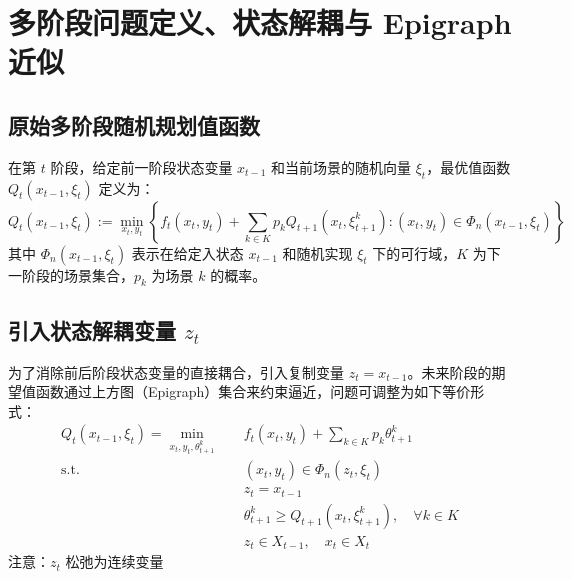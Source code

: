 \documentclass[11pt]{ctexart}
\begin{document}
\section{多阶段问题定义、状态解耦与 Epigraph 近似}

\subsection{原始多阶段随机规划值函数}
在第 $t$ 阶段，给定前一阶段状态变量 $x_{t-1}$ 和当前场景的随机向量 $\xi_t$，最优值函数 $Q_t(x_{t-1}, \xi_t)$ 定义为：
\begin{equation}
Q_{t}(x_{t-1}, \xi_{t}) := \min_{x_{t}, y_{t}} \left\{ f_{t}(x_{t}, y_{t}) + \sum_{k \in K} p_{k} Q_{t+1}(x_{t}, \xi_{t+1}^{k}) : (x_{t}, y_{t}) \in \Phi_{n}(x_{t-1}, \xi_{t}) \right\}
\end{equation}
其中 $\Phi_{n}(x_{t-1}, \xi_{t})$ 表示在给定入状态 $x_{t-1}$ 和随机实现 $\xi_t$ 下的可行域，$K$ 为下一阶段的场景集合，$p_k$ 为场景 $k$ 的概率。

\subsection{引入状态解耦变量 $z_t$}
为了消除前后阶段状态变量的直接耦合，引入复制变量 $z_{t} = x_{t-1}$。未来阶段的期望值函数通过上方图（Epigraph）集合来约束逼近，问题可调整为如下等价形式：
\begin{align}
Q_{t}(x_{t-1}, \xi_{t}) = \min_{x_{t}, y_{t}, \theta_{t+1}^{k}} \quad & f_{t}(x_{t}, y_{t}) + \sum_{k \in K} p_{k} \theta_{t+1}^{k} \\
\text{s.t.} \quad & (x_{t}, y_{t}) \in \Phi_{n}(z_{t}, \xi_{t}) \\
& z_{t} = x_{t-1} \\
& \theta_{t+1}^{k} \ge Q_{t+1}(x_{t}, \xi_{t+1}^{k}), \quad \forall k \in K \\
& z_{t} \in X_{t-1}, \quad x_{t} \in X_{t}
\end{align}
注意：$z_t$ 松弛为连续变量
\end{document}
